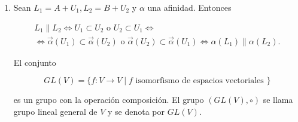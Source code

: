 \documentclass[12pt, a4paper, ones, notitlepage, openany,titlepage]{article}
\begin{document}
\begin{enumerate}[label=(\arabic*)]
\begin{enumerate}[label=(\alph*)]
		\item Sean $L_{1}=A+U_{1}, L_{2}=B+U_{2}$ y $\alpha$ una afinidad. Entonces
		
		\begin{gather*}
			L_{1} \| L_{2} \Longleftrightarrow U_{1} \subset U_{2} \text { o } U_{2} \subset U_{1} \Longleftrightarrow \\
			\Longleftrightarrow \overrightarrow{\alpha}\left(U_{1}\right) \subset \overrightarrow{\alpha}\left(U_{2}\right) \text { o } \overrightarrow{\alpha}\left(U_{2}\right) \subset \overrightarrow{\alpha}\left(U_{1}\right) \Longleftrightarrow \alpha\left(L_{1}\right) \| \alpha\left(L_{2}\right) .
		\end{gather*}
		
		El conjunto
		
		$$
		G L(V)=\{f: V \rightarrow V \mid f \text { isomorfismo de espacios vectoriales }\}
		$$
		
		es un grupo con la operación composición. El grupo $(G L(V), \circ)$ se llama grupo lineal general de $V$ y se denota por $G L(V)$.
		
	\end{enumerate}
\end{enumerate}
\end{document}
